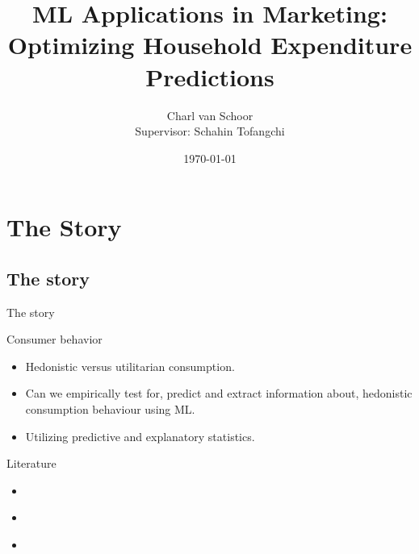 \documentclass{beamer}
\title{ML Applications in Marketing:  Optimizing Household Expenditure Predictions}
\author{Charl van Schoor \\ Supervisor: Schahin Tofangchi}
\date{\today}
\begin{document}
\begin{frame}
  \titlepage
\end{frame}


\section{The Story}

\subsection{The story}
\begin{frame}{The story}
\begin{block}{Consumer behavior}
\begin{itemize}
  \item Hedonistic versus utilitarian consumption. 
  \item Can we empirically test for, predict and extract information about, hedonistic consumption behaviour using ML.
  \item Utilizing predictive and explanatory statistics. 

\end{itemize}
\end{block}
\begin{block}{Literature}
\begin{itemize}

  \item \cite{hirschman1982hedonic}
  \item \cite{shmueli2010explain}
  \item \cite{babin}

\end{itemize}
\end{block}
\end{frame}
\end{document}
